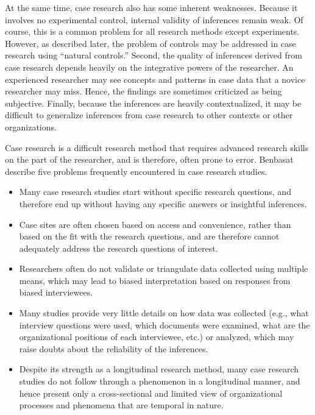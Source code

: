 At the same time, case research also has some inherent weaknesses. Because it involves no experimental control, internal validity of inferences remain weak. Of course, this is a common problem for all research methods except experiments. However, as described later, the problem of controls may be addressed in case research using ``natural controls.'' Second, the quality of inferences derived from case research depends heavily on the integrative powers of the researcher. An experienced researcher may see concepts and patterns in case data that a novice researcher may miss. Hence, the findings are sometimes criticized as being subjective. Finally, because the inferences are heavily contextualized, it may be difficult to generalize inferences from case research to other contexts or other organizations.

Case research is a difficult research method that requires advanced research skills on the part of the researcher, and is therefore, often prone to error. Benbasat\cite{benbasat1987case} describe five problems frequently encountered in case research studies.

\begin{itemize}
	\item Many case research studies start without specific research questions, and therefore end up without having any specific answers or insightful inferences.
	\item Case sites are often chosen based on access and convenience, rather than based on the fit with the research questions, and are therefore cannot adequately address the research questions of interest.
	\item Researchers often do not validate or triangulate data collected using multiple means, which may lead to biased interpretation based on responses from biased interviewees.
	\item Many studies provide very little details on how data was collected (e.g., what interview questions were used, which documents were examined, what are the organizational positions of each interviewee, etc.) or analyzed, which may raise doubts about the reliability of the inferences.
	\item Despite its strength as a longitudinal research method, many case research studies do not follow through a phenomenon in a longitudinal manner, and hence present only a cross-sectional and limited view of organizational processes and phenomena that are temporal in nature.
\end{itemize}

